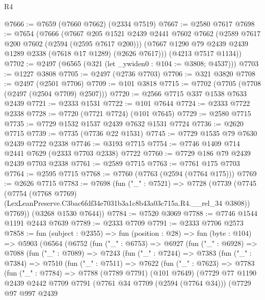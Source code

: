 \begin{lexlean}{R4}
\begin{coremodule}
@7666 := @7659 (@7660 @7662) (@2334 @7519)
@7667 := @2580 @7617
@7698 := @7654
    (@7666
      (@7667
        @205
        @1521
        @2439
        @2441
        @7602
        @7662
        (@2589 @7617 @200 @7602 (@2594 (@2595 @7617 @200)))
        (@7667 @1290 @79 @2439 @2439 @1289 @2338 (@7618 @17 @1289) (@2626 @7617)))
      (@4213 @7517 @1134))
@7702 := @2497 (@6565 (@321 (let _ywiden0 : @104 := @3808; @4537)))
@7703 := @1227 @3808
@7705 := @2497 (@2736 @7703)
@7706 := @321 @3820
@7708 := @2497 (@2501 @7706)
@7709 := @101 @3818
@7715 := @7702 (@7705 (@7708 (@2497 (@2504 @7709) @2507)))
@7720 := @2566 @7715 @337 @1538 @7633 @2439
@7721 := @2333 @1531
@7722 := @101 @7644
@7724 := @2333 @7722 @2338
@7728 := @7720 (@7721 @7724) (@101 @7645)
@7729 := @2580 @7715
@7735 := @7729 @1532 @1537 @2439 @7632 @1531 @7724
@7736 := @2620 @7715
@7739 := @7735 (@7736 @22 @1531)
@7745 := @7729 @1535 @79 @7630 @2439 @7722 @2338
@7746 := @3193 @7715
@7754 := @7746 @1409 @714 @2441 @7629 (@2333 @7703 @2338) @7722
@7760 := @7729 @186 @79 @2439 @2439 @7703 @2338
@7761 := @2589 @7715
@7763 := @7761 @175 @7703
@7764 := @2595 @7715
@7768 := @7760 (@7763 (@2594 (@7764 @175)))
@7769 := @2626 @7715
@7783 := @7698
    (fun ("_" : @7521) =>
    @7728
      (@7739
        (@7745
          (@7754
            (@7768 @7769)
            (LexLeanPreserve.C3bac6fdf34e7031b3a1c8b43a03c715a.R4.__rel_34 @3808))
          @7769))
      (@3268 @1530 @7644))
@7784 := @7520 @3069
@7788 := @7746 @1544 @1191 @2443 @7639
@7789 := @2333 @7709
@7791 := @2333 @7706 @2573
@7858 := fun (subject : @2355) =>
  fun (position : @28) =>
  fun (byte : @104) =>
  @5903
    (@6564
      (@6752
        (fun ("_" : @6753) =>
        @6927
          (fun ("_" : @6928) =>
          @7088
            (fun ("_" : @7089) =>
            @7243
              (fun ("_" : @7244) =>
              @7383
                (fun ("_" : @7384) =>
                @7510
                  (fun ("_" : @7511) =>
                  @7622
                    (fun ("_" : @7623) =>
                    @7783
                      (fun ("_" : @7784) =>
                      @7788
                        (@7789 @7791)
                        (@101 @7649)
                        (@7729
                          @77
                          @1190
                          @2439
                          @2442
                          @7709
                          @7791
                          (@7761 @34 @7709 (@2594 (@7764 @34)))
                          (@7729
                            @97
                            @997
                            @2439

\end{coremodule}
\end{lexlean}
